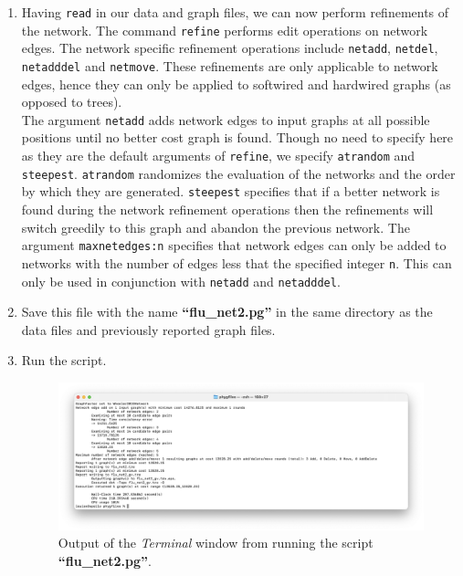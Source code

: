 \documentclass[11pt]{article}
\begin{document}
\begin {enumerate}
\item Having \texttt{read} in our data and graph files, we can now perform refinements 
of the network. The command \texttt{refine} performs edit operations on network 
edges. The network specific refinement operations include \texttt{netadd}, 
\texttt{netdel}, \texttt{netadddel} and \texttt{netmove}. These refinements are 
only applicable to network edges, hence they can only be applied to softwired 
and hardwired graphs (as opposed to trees). \\

The argument \texttt{netadd} adds network edges to input graphs at all possible
positions until no better cost graph is found. Though no need to specify here as
they are the default arguments of \texttt{refine}, we specify \texttt{atrandom} and 
\texttt{steepest}. \texttt{atrandom} randomizes the evaluation of the networks and 
the order by which they are generated. \texttt{steepest} specifies that if a better 
network is found during the network refinement operations then the refinements 
will switch greedily to this graph and abandon the previous network. The argument  
\texttt{maxnetedges:n} specifies that network edges can only be added to networks 
with the number of edges less that the specified integer \texttt{n}. This can only be 
used in conjunction with \texttt{netadd} and \texttt{netadddel}.

\item Save this file with the name \textbf{``flu\_net2.pg''} in the same directory as the 
data files and previously reported graph files.

\item Run the script.

\begin{figure}[H]
\centering
\includegraphics[width=\textwidth]{output1.png}
\caption{Output of the \textit{Terminal} window from running the script 
\textbf{``flu\_net2.pg''}.}
\label{output1}
\end{figure}


\end{enumerate}
\end{document}
